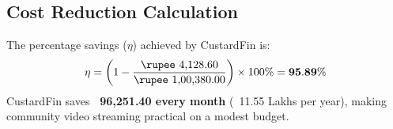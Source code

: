 \subsection{Cost Reduction Calculation}
The percentage savings ($\eta$) achieved by CustardFin is:
\begin{equation}
    \eta = \left( 1 - \frac{\text{\rupee~4{,}128.60}}{\text{\rupee~1{,}00{,}380.00}} \right) \times 100\% = \mathbf{95.89\%}
\end{equation}
CustardFin saves \textbf{\rupee~96,251.40 every month} (\rupee~11.55 Lakhs per year), making community video streaming practical on a modest budget.
